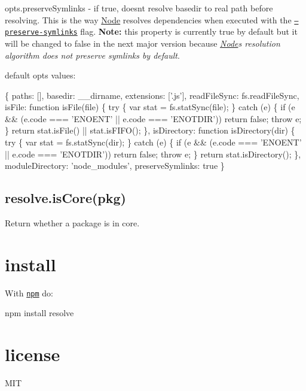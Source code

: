 \begin{DoxyItemize}
\item opts.\+preserve\+Symlinks -\/ if true, doesn\textquotesingle{}t resolve {\ttfamily basedir} to real path before resolving. This is the way \mbox{\hyperlink{classNode}{Node}} resolves dependencies when executed with the \href{https://nodejs.org/api/all.html#cli_preserve_symlinks}{\tt --preserve-\/symlinks} flag. {\bfseries Note\+:} this property is currently {\ttfamily true} by default but it will be changed to {\ttfamily false} in the next major version because {\itshape \mbox{\hyperlink{classNode}{Node}}\textquotesingle{}s resolution algorithm does not preserve symlinks by default}.
\end{DoxyItemize}

default {\ttfamily opts} values\+:


\begin{DoxyCode}
\{
    paths: [],
    basedir: \_\_dirname,
    extensions: ['.js'],
    readFileSync: fs.readFileSync,
    isFile: function isFile(file) \{
        try \{
            var stat = fs.statSync(file);
        \} catch (e) \{
            if (e && (e.code === 'ENOENT' || e.code === 'ENOTDIR')) return false;
            throw e;
        \}
        return stat.isFile() || stat.isFIFO();
    \},
    isDirectory: function isDirectory(dir) \{
        try \{
            var stat = fs.statSync(dir);
        \} catch (e) \{
            if (e && (e.code === 'ENOENT' || e.code === 'ENOTDIR')) return false;
            throw e;
        \}
        return stat.isDirectory();
    \},
    moduleDirectory: 'node\_modules',
    preserveSymlinks: true
\}
\end{DoxyCode}


\subsection*{resolve.\+is\+Core(pkg)}

Return whether a package is in core.

\section*{install}

With \href{https://npmjs.org}{\tt npm} do\+:


\begin{DoxyCode}
npm install resolve
\end{DoxyCode}


\section*{license}

M\+IT 